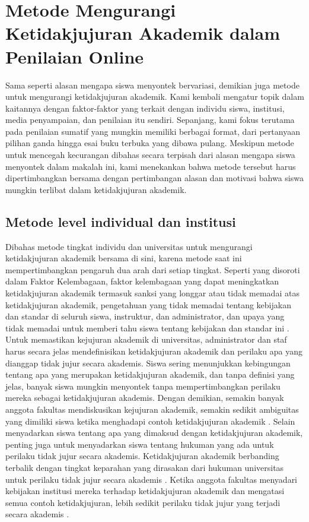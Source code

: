 \section{Metode Mengurangi Ketidakjujuran Akademik dalam Penilaian Online}
\label{sec:antiketidakjujuranakademik}

Sama seperti alasan mengapa siswa menyontek bervariasi, demikian juga metode untuk mengurangi ketidakjujuran akademik. Kami kembali mengatur topik dalam kaitannya dengan faktor-faktor yang terkait dengan individu siswa, institusi, media penyampaian, dan penilaian itu sendiri. Sepanjang, kami fokus terutama pada penilaian sumatif yang mungkin memiliki berbagai format, dari pertanyaan pilihan ganda hingga esai buku terbuka yang dibawa pulang. Meskipun metode untuk mencegah kecurangan dibahas secara terpisah dari alasan mengapa siswa menyontek dalam makalah ini, kami menekankan bahwa metode tersebut harus dipertimbangkan bersama dengan pertimbangan alasan dan motivasi bahwa siswa mungkin terlibat dalam ketidakjujuran akademik.

\subsection{Metode level individual dan institusi}
\label{subsec:levelindividuinstitusi}

Dibahas metode tingkat individu dan universitas untuk mengurangi ketidakjujuran akademik bersama di sini, karena metode saat ini mempertimbangkan pengaruh dua arah dari setiap tingkat. Seperti yang disoroti dalam Faktor Kelembagaan, faktor kelembagaan yang dapat meningkatkan ketidakjujuran akademik termasuk sanksi yang longgar atau tidak memadai atas ketidakjujuran akademik, pengetahuan yang tidak memadai tentang kebijakan dan standar di seluruh siswa, instruktur, dan administrator, dan upaya yang tidak memadai untuk memberi tahu siswa tentang kebijakan dan standar ini \citep{akbulut2008exploring} \citep{jordan2001college}. Untuk memastikan kejujuran akademik di universitas, administrator dan staf harus secara jelas mendefinisikan ketidakjujuran akademik dan perilaku apa yang dianggap tidak jujur secara akademis. Siswa sering menunjukkan kebingungan tentang apa yang merupakan ketidakjujuran akademik, dan tanpa definisi yang jelas, banyak siswa mungkin menyontek tanpa mempertimbangkan perilaku mereka sebagai ketidakjujuran akademis. Dengan demikian, semakin banyak anggota fakultas mendiskusikan kejujuran akademik, semakin sedikit ambiguitas yang dimiliki siswa ketika menghadapi contoh ketidakjujuran akademik \citep{tatum2017honor}. Selain menyadarkan siswa tentang apa yang dimaksud dengan ketidakjujuran akademik, penting juga untuk menyadarkan siswa tentang hukuman yang ada untuk perilaku tidak jujur secara akademis. Ketidakjujuran akademik berbanding terbalik dengan tingkat keparahan yang dirasakan dari hukuman universitas untuk perilaku tidak jujur secara akademis \citep{mccabe2002honor}. Ketika anggota fakultas menyadari kebijakan institusi mereka terhadap ketidakjujuran akademik dan mengatasi semua contoh ketidakjujuran, lebih sedikit perilaku tidak jujur yang terjadi secara akademis \citep{boehm2009promoting}.

